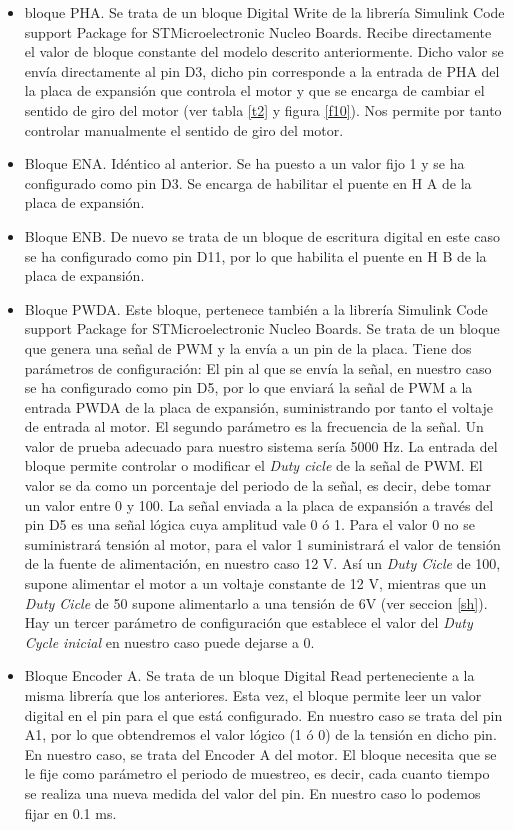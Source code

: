 \documentclass[10pt,a4paper]{report}
\begin{document}
\begin{itemize}
\item bloque PHA. Se trata de un bloque Digital Write de la librería Simulink Code support Package for STMicroelectronic Nucleo Boards. Recibe directamente el valor de bloque constante del modelo descrito anteriormente. Dicho valor se envía directamente al pin D3, dicho pin corresponde a la entrada de PHA del la placa de expansión que controla el motor y que se encarga de cambiar el sentido de giro del motor (ver tabla \ref{t2} y figura \ref{f10}). Nos permite por tanto controlar manualmente el sentido de giro del motor.
\item Bloque ENA. Idéntico al anterior. Se ha puesto a un valor fijo 1 y se ha configurado como pin D3. Se encarga de habilitar el puente en H A de la placa de expansión.
\item Bloque ENB. De nuevo se trata de un bloque de escritura digital en este caso se ha configurado como pin D11, por lo que habilita el puente en H B de la placa de expansión.
\item Bloque PWDA. Este bloque, pertenece también a la librería Simulink Code support Package for STMicroelectronic Nucleo Boards. Se trata de un bloque que genera una señal de PWM y la envía a un pin de la placa. Tiene dos parámetros de configuración: El pin al que se envía la señal, en nuestro caso se ha configurado como pin D5, por lo que enviará la señal de PWM a la entrada PWDA de la placa de expansión, suministrando por tanto el voltaje de entrada al motor. El segundo parámetro es la frecuencia de la señal. Un valor de prueba adecuado para nuestro sistema sería 5000 Hz. La entrada del bloque permite controlar o modificar el \emph{Duty cicle} de la señal de PWM. El valor se da como un porcentaje del periodo de la señal, es decir, debe tomar un valor entre 0 y 100. La señal enviada a la placa de expansión a través del pin D5 es una señal lógica cuya amplitud vale 0 ó 1. Para el valor 0 no se suministrará tensión al motor, para el valor 1 suministrará el valor de tensión de la fuente de alimentación, en nuestro caso 12 V. Así un \emph{Duty Cicle} de 100, supone alimentar el motor a un voltaje constante de 12 V, mientras que un \emph{Duty Cicle} de 50 supone alimentarlo a una tensión de 6V (ver seccion \ref{sh}). Hay un tercer parámetro de configuración que establece el valor del \emph{Duty Cycle inicial} en nuestro caso puede dejarse a 0.

\item Bloque Encoder A. Se trata de un bloque Digital Read perteneciente a la misma librería que los anteriores. Esta vez, el bloque permite leer un valor digital en el pin para el que está configurado. En nuestro caso se trata del pin A1, por lo que obtendremos el valor lógico (1 ó 0) de la tensión en dicho pin. En nuestro caso, se trata del Encoder A  del motor. El bloque necesita que se le fije como parámetro el periodo de muestreo, es decir, cada cuanto tiempo se realiza una nueva medida del valor del pin.  En nuestro caso lo podemos fijar en 0.1 ms.


\end{itemize}
\end{document}
